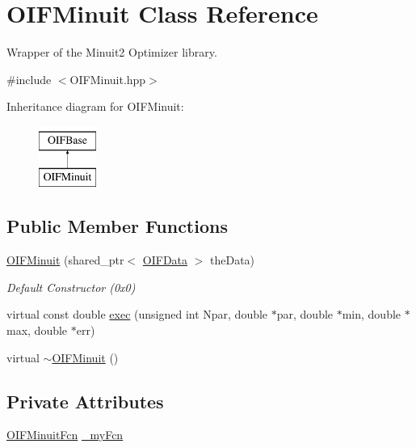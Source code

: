 \hypertarget{classOIFMinuit}{
\section{OIFMinuit Class Reference}
\label{d5/db7/classOIFMinuit}
}


Wrapper of the Minuit2 Optimizer library.  




{\ttfamily \#include $<$OIFMinuit.hpp$>$}

Inheritance diagram for OIFMinuit:\begin{figure}[H]
\begin{center}
\leavevmode
\includegraphics[height=2.000000cm]{d5/db7/classOIFMinuit}
\end{center}
\end{figure}
\subsection*{Public Member Functions}
\begin{DoxyCompactItemize}
\item 
\hyperlink{classOIFMinuit_a0da3f879b8d2d884c145cb8a6e6411fe}{OIFMinuit} (shared\_\-ptr$<$ \hyperlink{classOIFData}{OIFData} $>$ theData)
\begin{DoxyCompactList}\small\item\em Default Constructor (0x0) \end{DoxyCompactList}\item 
virtual const double \hyperlink{classOIFMinuit_a6a8ff974bdddf918ab2abb5a5a7810b6}{exec} (unsigned int Npar, double $\ast$par, double $\ast$min, double $\ast$max, double $\ast$err)
\item 
virtual \hyperlink{classOIFMinuit_ac0653bc60bb66da10970480d76596975}{$\sim$OIFMinuit} ()
\end{DoxyCompactItemize}
\subsection*{Private Attributes}
\begin{DoxyCompactItemize}
\item 
\hyperlink{classROOT_1_1Minuit2_1_1OIFMinuitFcn}{OIFMinuitFcn} \hyperlink{classOIFMinuit_ae4ec346c614ffd9881ab2c24f9024351}{\_\-myFcn}
\end{DoxyCompactItemize}



